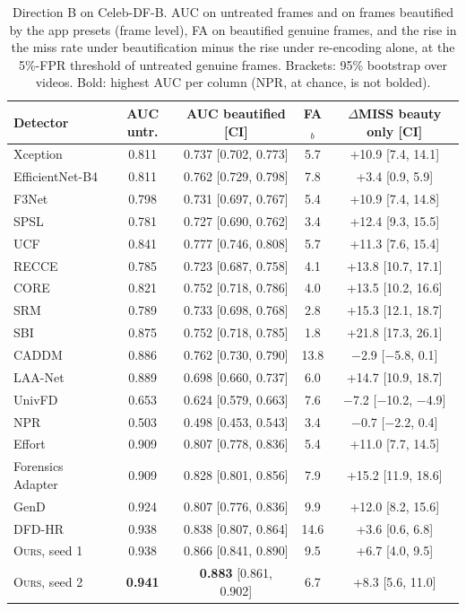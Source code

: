 \documentclass[conference]{IEEEtran}
\newcommand{\ours}{\textsc{Ours}}
\begin{document}
\begin{table}[t]
\centering
\caption{Direction B on Celeb-DF-B. AUC on untreated frames and on frames beautified by the app presets (frame level), FA on
beautified genuine frames, and the rise in the miss rate under beautification minus the rise under re-encoding alone, at the
5\%-FPR threshold of untreated genuine frames. Brackets: 95\% bootstrap over videos. Bold: highest AUC per column (NPR, at chance, is not bolded).}
\label{tab:dirB}
\scriptsize
\setlength{\tabcolsep}{2.5pt}
\begin{tabular}{@{}l c c c c@{}}
\toprule
Detector & AUC untr. & AUC beautified [CI] & FA$_b$ & $\Delta$MISS beauty only [CI] \\
\midrule
Xception & 0.811 & 0.737 [0.702, 0.773] & 5.7 & +10.9 [7.4, 14.1] \\
EfficientNet-B4 & 0.811 & 0.762 [0.729, 0.798] & 7.8 & +3.4 [0.9, 5.9] \\
F3Net & 0.798 & 0.731 [0.697, 0.767] & 5.4 & +10.9 [7.4, 14.8] \\
SPSL & 0.781 & 0.727 [0.690, 0.762] & 3.4 & +12.4 [9.3, 15.5] \\
UCF & 0.841 & 0.777 [0.746, 0.808] & 5.7 & +11.3 [7.6, 15.4] \\
RECCE & 0.785 & 0.723 [0.687, 0.758] & 4.1 & +13.8 [10.7, 17.1] \\
CORE & 0.821 & 0.752 [0.718, 0.786] & 4.0 & +13.5 [10.2, 16.6] \\
SRM & 0.789 & 0.733 [0.698, 0.768] & 2.8 & +15.3 [12.1, 18.7] \\
SBI & 0.875 & 0.752 [0.718, 0.785] & 1.8 & +21.8 [17.3, 26.1] \\
CADDM & 0.886 & 0.762 [0.730, 0.790] & 13.8 & $-$2.9 [$-$5.8, 0.1] \\
LAA-Net & 0.889 & 0.698 [0.660, 0.737] & 6.0 & +14.7 [10.9, 18.7] \\
UnivFD & 0.653 & 0.624 [0.579, 0.663] & 7.6 & $-$7.2 [$-$10.2, $-$4.9] \\
NPR & 0.503 & 0.498 [0.453, 0.543] & 3.4 & $-$0.7 [$-$2.2, 0.4] \\
Effort & 0.909 & 0.807 [0.778, 0.836] & 5.4 & +11.0 [7.7, 14.5] \\
Forensics Adapter & 0.909 & 0.828 [0.801, 0.856] & 7.9 & +15.2 [11.9, 18.6] \\
GenD & 0.924 & 0.807 [0.776, 0.836] & 9.9 & +12.0 [8.2, 15.6] \\
DFD-HR & 0.938 & 0.838 [0.807, 0.864] & 14.6 & +3.6 [0.6, 6.8] \\
\midrule
\ours{}, seed 1 & 0.938 & 0.866 [0.841, 0.890] & 9.5 & +6.7 [4.0, 9.5] \\
\ours{}, seed 2 & \textbf{0.941} & \textbf{0.883} [0.861, 0.902] & 6.7 & +8.3 [5.6, 11.0] \\
\bottomrule
\end{tabular}
\end{table}
\end{document}
